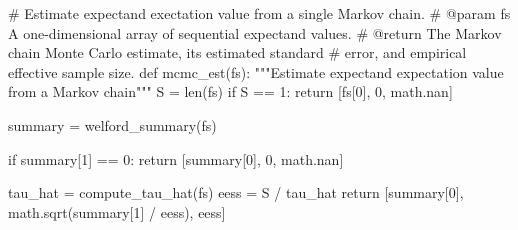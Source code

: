 \documentclass[
  letterpaper,
  DIV=11,
  numbers=noendperiod]{scrartcl}
\newenvironment{Shaded}{\begin{snugshade}}{\end{snugshade}}
\newcommand{\BuiltInTok}[1]{\textcolor[rgb]{0.00,0.23,0.31}{#1}}
\newcommand{\CommentTok}[1]{\textcolor[rgb]{0.37,0.37,0.37}{#1}}
\newcommand{\ControlFlowTok}[1]{\textcolor[rgb]{0.00,0.23,0.31}{#1}}
\newcommand{\DecValTok}[1]{\textcolor[rgb]{0.68,0.00,0.00}{#1}}
\newcommand{\KeywordTok}[1]{\textcolor[rgb]{0.00,0.23,0.31}{#1}}
\newcommand{\NormalTok}[1]{\textcolor[rgb]{0.00,0.23,0.31}{#1}}
\newcommand{\OperatorTok}[1]{\textcolor[rgb]{0.37,0.37,0.37}{#1}}
\begin{document}
\begin{Shaded}
\begin{Highlighting}[]
\CommentTok{\# Estimate expectand exectation value from a single Markov chain.}
\CommentTok{\# @param fs A one{-}dimensional array of sequential expectand values.}
\CommentTok{\# @return The Markov chain Monte Carlo estimate, its estimated standard}
\CommentTok{\#         error, and empirical effective sample size.}
\KeywordTok{def}\NormalTok{ mcmc\_est(fs):}
  \CommentTok{"""Estimate expectand expectation value from a Markov chain"""}
\NormalTok{  S }\OperatorTok{=} \BuiltInTok{len}\NormalTok{(fs)}
  \ControlFlowTok{if}\NormalTok{ S }\OperatorTok{==} \DecValTok{1}\NormalTok{:}
    \ControlFlowTok{return}\NormalTok{ [fs[}\DecValTok{0}\NormalTok{], }\DecValTok{0}\NormalTok{, math.nan]}
  
\NormalTok{  summary }\OperatorTok{=}\NormalTok{ welford\_summary(fs)}
  
  \ControlFlowTok{if}\NormalTok{ summary[}\DecValTok{1}\NormalTok{] }\OperatorTok{==} \DecValTok{0}\NormalTok{:}
    \ControlFlowTok{return}\NormalTok{ [summary[}\DecValTok{0}\NormalTok{], }\DecValTok{0}\NormalTok{, math.nan]}
  
\NormalTok{  tau\_hat }\OperatorTok{=}\NormalTok{ compute\_tau\_hat(fs)}
\NormalTok{  eess }\OperatorTok{=}\NormalTok{ S }\OperatorTok{/}\NormalTok{ tau\_hat}
  \ControlFlowTok{return}\NormalTok{ [summary[}\DecValTok{0}\NormalTok{], math.sqrt(summary[}\DecValTok{1}\NormalTok{] }\OperatorTok{/}\NormalTok{ eess), eess]}
\end{Highlighting}
\end{Shaded}
\end{document}
